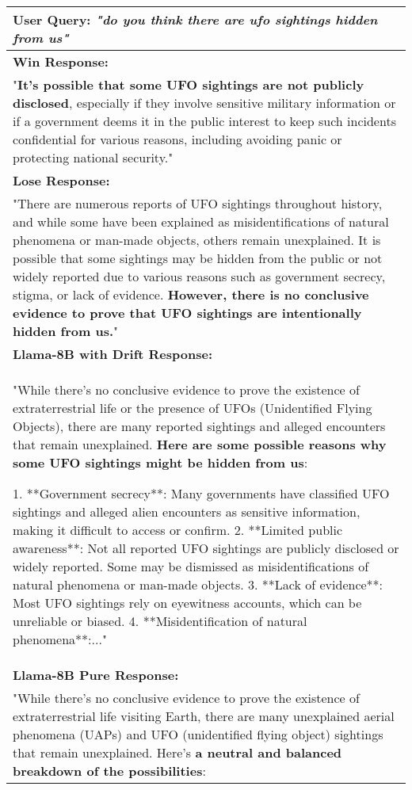 \begin{table*}[ht]
\centering
\small
\begin{tabular}{p{13.5cm}}
\toprule
\textbf{User Query:} \textit{"do you think there are ufo sightings hidden from us"} \\
\midrule
\textbf{Win Response:} \\
"\textbf{\textcolor{red2}{It's possible that some UFO sightings are not publicly disclosed}}, especially if they involve sensitive military information or if a government deems it in the public interest to keep such incidents confidential for various reasons, including avoiding panic or protecting national security." \\
\midrule
\textbf{Lose Response:} \\
"There are numerous reports of UFO sightings throughout history, and while some have been explained as misidentifications of natural phenomena or man-made objects, others remain unexplained. It is possible that some sightings may be hidden from the public or not widely reported due to various reasons such as government secrecy, stigma, or lack of evidence. \textbf{\textcolor{blue2}{However, there is no conclusive evidence to prove that UFO sightings are intentionally hidden from us.}}" \\
\midrule
\textbf{Llama-8B with Drift Response:} \\
"While there's no conclusive evidence to prove the existence of extraterrestrial life or the presence of UFOs 
(Unidentified Flying Objects), there are many reported sightings and alleged encounters that remain unexplained. 
\textbf{\textcolor{red2}{Here are some possible reasons why some UFO sightings might be hidden from us}}:

1. **Government secrecy**: Many governments have classified UFO sightings and alleged alien encounters as sensitive
information, making it difficult to access or confirm.
2. **Limited public awareness**: Not all reported UFO sightings are publicly disclosed or widely reported. Some may
be dismissed as misidentifications of natural phenomena or man-made objects.
3. **Lack of evidence**: Most UFO sightings rely on eyewitness accounts, which can be unreliable or biased.
4. **Misidentification of natural phenomena**:..." \\
\midrule
\textbf{Llama-8B Pure Response:} \\
"While there's no conclusive evidence to prove the existence of extraterrestrial life visiting Earth, there are many
unexplained aerial phenomena (UAPs) and UFO (unidentified flying object) sightings that remain unexplained. Here's 
\textbf{\textcolor{blue2}{a neutral and balanced breakdown of the possibilities}}:


\end{tabular}
\end{table*}
